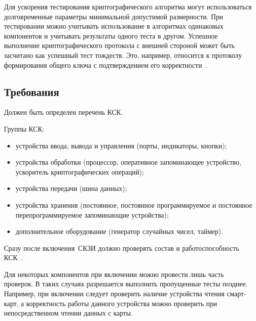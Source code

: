 Для ускорения тестирования криптографического алгоритма
могут использоваться долговременные параметры минимальной допустимой 
размерности. При тестировании можно учитывать 
использование в алгоритмах одинаковых компонентов и учитывать результаты
одного теста в другом. Успешное выполнение 
криптографического протокола с внешней стороной может быть засчитано
как успешный тест тождеств. Это, например, относится к протоколу 
формирования общего ключа с подтверждением его корректности~.


\subsection{Требования}\label{ST.Reqs}

\label{R.ST.CSCList}
Должен быть определен перечень КСК.

Группы КСК:
\begin{itemize}
\item
устройства ввода, вывода и управления (порты, индикаторы, кнопки);
\item
устройства обработки (процессор, оперативное запоминающее устройство, 
ускоритель криптографических операций); 
\item
устройства передачи (шина данных);
\item
устройства хранения (постоянное, постоянное программируемое и постоянное 
перепрограммируемое запоминающие устройства); 
\item
дополнительное оборудование (генератор случайных чисел, таймер). 
\end{itemize}
\fi

\label{R.ST.CSCTests}
Сразу после включения~СКЗИ должно проверять состав 
и работоспособность КСК~.

\begin{note}
Для некоторых компонентов при включении можно провести лишь часть 
проверок. В таких случаях разрешается выполнить пропущенные тесты позднее. 
Например, при включении следует проверить наличие устройства чтения 
смарт-карт, а корректность работы данного устройства можно проверить при 
непосредственном чтении данных с карты. 
\end{note}


